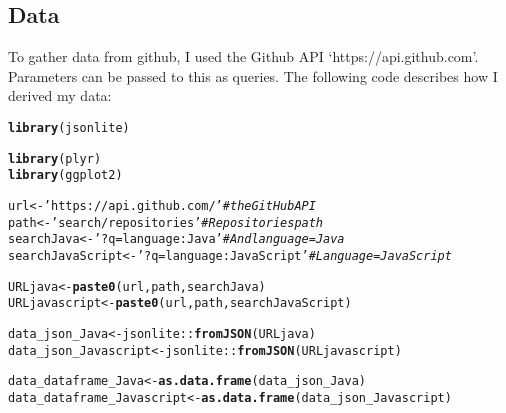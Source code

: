 \documentclass{article}\usepackage[]{graphicx}\usepackage[]{color}
\makeatletter
\newcommand{\hlstr}[1]{\textcolor[rgb]{0.192,0.494,0.8}{#1}}%
\newcommand{\hlcom}[1]{\textcolor[rgb]{0.678,0.584,0.686}{\textit{#1}}}%
\newcommand{\hlopt}[1]{\textcolor[rgb]{0,0,0}{#1}}%
\newcommand{\hlstd}[1]{\textcolor[rgb]{0.345,0.345,0.345}{#1}}%
\newcommand{\hlkwb}[1]{\textcolor[rgb]{0.69,0.353,0.396}{#1}}%
\newcommand{\hlkwd}[1]{\textcolor[rgb]{0.737,0.353,0.396}{\textbf{#1}}}%
\newenvironment{kframe}{%
 \def\at@end@of@kframe{}%
 \ifinner\ifhmode%
  \def\at@end@of@kframe{\end{minipage}}%
  \begin{minipage}{\columnwidth}%
 \fi\fi%
 \def\FrameCommand##1{\hskip\@totalleftmargin \hskip-\fboxsep
 \colorbox{shadecolor}{##1}\hskip-\fboxsep
     \hskip-\linewidth \hskip-\@totalleftmargin \hskip\columnwidth}%
 \MakeFramed {\advance\hsize-\width
   \@totalleftmargin\z@ \linewidth\hsize
   \@setminipage}}%
 {\par\unskip\endMakeFramed%
 \at@end@of@kframe}
\newenvironment{knitrout}{}{} %
\makeatother
\begin{document}

\bigskip

\subsection*{Data}
To gather data from github, I used the Github API ‘https://api.github.com’. Parameters can be passed to this as queries. The following code describes how I derived my data:

\begin{knitrout}
\color{fgcolor}\begin{kframe}
\begin{alltt}
\hlkwd{library}\hlstd{(jsonlite)}
\end{alltt}


{\ttfamily\noindent\itshape\color{messagecolor}{\#\# \\\#\# Attaching package: 'jsonlite'\\\#\# \\\#\# The following object is masked from 'package:utils':\\\#\# \\\#\#\ \ \ \  View}}\begin{alltt}
\hlkwd{library} \hlstd{(plyr)}
\hlkwd{library} \hlstd{(ggplot2)}

\hlstd{url}  \hlkwb{<-} \hlstr{'https://api.github.com/'}                 \hlcom{# the GitHub API}
\hlstd{path} \hlkwb{<-} \hlstr{'search/repositories'}                     \hlcom{# Repositories path}
\hlstd{searchJava} \hlkwb{<-} \hlstr{'?q=language:Java'}                  \hlcom{# And language = Java}
\hlstd{searchJavaScript} \hlkwb{<-} \hlstr{'?q=language:JavaScript'}      \hlcom{# Language = JavaScript}

\hlstd{URLjava}\hlkwb{<-}\hlkwd{paste0}\hlstd{(url,path,searchJava)}
\hlstd{URLjavascript}\hlkwb{<-}\hlkwd{paste0}\hlstd{(url,path,searchJavaScript)}

\hlstd{data_json_Java}\hlkwb{<-}\hlstd{jsonlite}\hlopt{::}\hlkwd{fromJSON}\hlstd{(URLjava)}
\hlstd{data_json_Javascript}\hlkwb{<-}\hlstd{jsonlite}\hlopt{::}\hlkwd{fromJSON}\hlstd{(URLjavascript)}

\hlstd{data_dataframe_Java}\hlkwb{<-}\hlkwd{as.data.frame}\hlstd{(data_json_Java)}
\hlstd{data_dataframe_Javascript}\hlkwb{<-}\hlkwd{as.data.frame}\hlstd{(data_json_Javascript)}


\end{alltt}
\end{kframe}
\end{knitrout}
\end{document}
